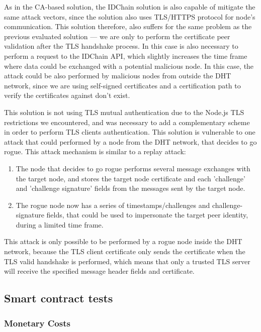 As in the CA-based solution, the IDChain solution is also capable of mitigate the same attack vectors, since the solution also uses TLS/HTTPS protocol for node's communication.
This solution therefore, also suffers for the same problem as the previous evaluated solution — we are only to perform the certificate peer validation after the TLS handshake process.
In this case is also necessary to perform a request to the IDChain API, which slightly increases the time frame where data could be exchanged with a potential malicious node.
In this case, the attack could be also performed by malicious nodes from outside the DHT network, since we are using self-signed certificates and a certification path to verify the certificates against don't exist.

This solution is not using TLS mutual authentication due to the Node.js TLS restrictions we encountered, and was necessary to add a complementary scheme in order to perform TLS clients authentication.
This solution is vulnerable to one attack that could performed by a node from the DHT network, that decides to go rogue.
This attack mechanism is similar to a replay attack:

\begin{enumerate}
  \item The node that decides to go rogue performs several message exchanges with the target node, and stores the target node certificate and each 'challenge' and 'challenge signature' fields from the messages sent by the target node.
  \item The rogue node now has a series of timestamps/challenges and challenge-signature fields, that could be used to impersonate the target peer identity, during a limited time frame.
\end{enumerate}

This attack is only possible to be performed by a rogue node inside the DHT network, because the TLS client certificate only sends the certificate when the TLS valid handshake is performed, which means that only a trusted TLS server will receive the specified message header fields and certificate.

\subsection{Smart contract tests}
\label{section:smart-contract-tests}

\subsubsection{Monetary Costs}

